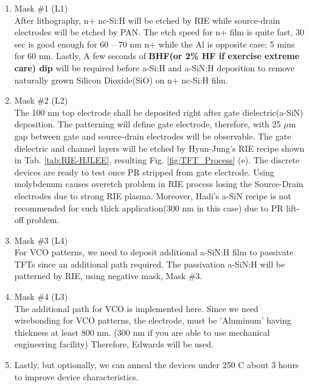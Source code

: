 \begin{enumerate}
\item Mask \#1 (L1) \\
  After lithography, n+ nc-Si:H will be etched by RIE while source-drain electrodes will be etched by PAN. The etch speed for n+ film is quite fast, 30 sec is good enough for 60 -- 70 nm n+ while the Al is opposite case; 5 mins for 60 nm. Lastly, A few seconds of \textbf{BHF(or 2\% HF if exercise extreme care) dip} will be required before a-Si:H and a-SiN:H deposition to remove naturally grown Silicon Dioxide(SiO) on n+ nc-Si:H film.
\item Mask \#2 (L2) \\
  The 100 nm top electrode shall be deposited right after gate dielectric(a-SiN) deposition. The patterning will define gate electrode, therefore, with 25 $\mu$m gap between gate and source-drain electrodes will be observable. The gate dielectric and channel layers will be etched by Hyun-Jung's RIE recipe shown in Tab. \ref{tab:RIE-HJLEE}, resulting Fig. \ref{fig:TFT_Process} (e). The discrete devices are ready to test once PR stripped from gate electrode. Using molybdenum causes overetch problem in RIE process losing the Source-Drain electrodes due to strong RIE plasma. Moreover, Hadi's a-SiN recipe is not recommended for such thick application(300 nm in this case) due to PR lift-off problem.
\item Mask \#3 (L4) \\
  For VCO patterns, we need to deposit additional a-SiN:H film to passivate TFTs since an additional path required. The passivation a-SiN:H will be patterned by RIE, using negative mask, Mask \#3.
\item Mask \#4 (L3) \\
  The additional path for VCO is implemented here. Since we need wirebonding for VCO patterns, the electrode, must be 'Aluminum' having thickness at least 800 nm. (300 nm if you are able to use mechanical engineering facility) Therefore, Edwards will be used.
\item Lastly, but optionally, we can anneal the devices under 250 C about 3 hours to improve device characteristics. 
\end{enumerate}
